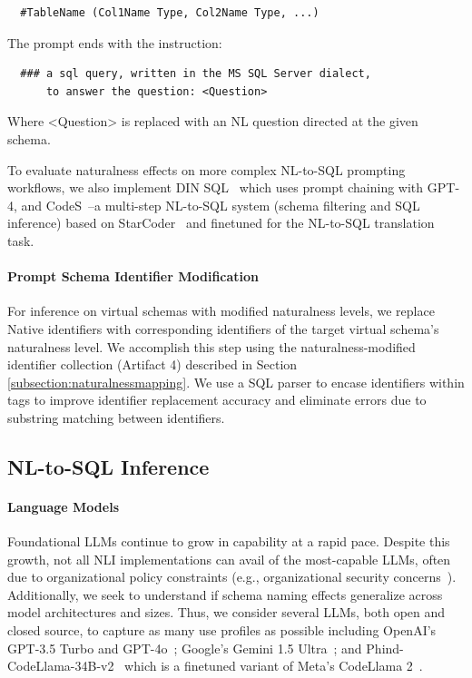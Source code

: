 \begin{verbatim}
  #TableName (Col1Name Type, Col2Name Type, ...)
\end{verbatim}

The prompt ends with the instruction:

\begin{verbatim}
  ### a sql query, written in the MS SQL Server dialect, 
      to answer the question: <Question>
\end{verbatim}

Where <Question> is replaced with an NL question directed at the given schema.

To evaluate naturalness effects on more complex NL-to-SQL prompting workflows, we also implement DIN SQL~\cite{pourreza2023dinsql} which uses prompt chaining with GPT-4, and CodeS~\cite{10.1145/3654930}--a multi-step NL-to-SQL system (schema filtering and SQL inference) based on StarCoder~\cite{li2023starcoder} and finetuned for the NL-to-SQL translation task.

\paragraph{\textbf{Prompt Schema Identifier Modification}}
For inference on virtual schemas with modified naturalness levels, we replace Native identifiers with corresponding identifiers of the target virtual schema's naturalness level.
We accomplish this step using the naturalness-modified identifier collection (Artifact 4) described in Section \ref{subsection:naturalnessmapping}.
We use a SQL parser to encase identifiers within tags to improve identifier replacement accuracy and eliminate errors due to substring matching between identifiers.

\subsection{NL-to-SQL Inference}

\paragraph{\textbf{Language Models}}
Foundational LLMs continue to grow in capability at a rapid pace.
Despite this growth, not all NLI implementations can avail of the most-capable LLMs, often due to organizational policy constraints (e.g., organizational security concerns~\cite{gsa-llm-directive}).
Additionally, we seek to understand if schema naming effects generalize across model architectures and sizes.
Thus, we consider several LLMs, both open and closed source, to capture as many use profiles as possible including OpenAI's GPT-3.5 Turbo and GPT-4o~\cite{openai-chatgpt-blog-post, openai-api-documentation}; Google's Gemini 1.5 Ultra~\cite{geminiteam2024gemini, geminiteam2024gemini15}; and Phind-CodeLlama-34B-v2~\cite{phind2022phindcodellama} which is a finetuned variant of Meta's CodeLlama 2~\cite{roziere2023code}.

